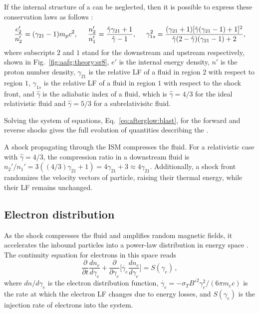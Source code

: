 If the internal structure of a \blast{} can be neglected, then 
it is possible to express these conservation laws as follows 
\citep{Blandford:1976,Rezzolla:2013}: 
\begin{equation}
\frac{e_2'}{n_2'} = (\gamma_{21} - 1)m_p c^2, \hspace{5mm}
\frac{n_2'}{n_1'} = \frac{\hat{\gamma}\gamma_{21} + 1}{\hat{\gamma}-1}, \hspace{5mm}
\gamma_{1s}^2 = \frac{(\gamma_{21} + 1) [\hat{\gamma}(\gamma_{21}-1)+1]^2}{\hat{\gamma}(2-\hat{\gamma})(\gamma_{21}-1)+2},
\label{eq:afterglow:blast}
\end{equation}
where subscripts $2$ and $1$ stand for the downstream and upstream respectively, 
shown in Fig.~\ref{fig:aafg:theory:sr8}, 
$e'$ is the internal energy density, $n'$ is the proton number density, 
$\gamma_{21}$ is the relative \ac{LF} of a fluid in region $2$ with respect to region $1$, 
$\gamma_{1s}$ is the relative \ac{LF} of a fluid in region $1$ with respect to the shock front, and
$\hat{\gamma}$ is the adiabatic index of a fluid, which is $\hat{\gamma}=4/3$ 
for the ideal relativistic fluid and $\hat{\gamma}=5/3$ for a subrelativisitc fluid.

Solving the system of equations, Eq.~\eqref{eq:afterglow:blast}, for the 
forward and reverse shocks gives the full evolution of 
quantities describing the \blast{}. 

A shock propagating through the \ac{ISM} compresses the fluid. 
For a relativistic case with $\hat{\gamma}=4/3$, the compression ratio in a downstream fluid is 
$n_2'/n_1' = 3 ((4/3)\gamma_{21} + 1) = 4\gamma_{21} + 3 \approx 4 \gamma_{21}$. 
%
Additionally, a shock front randomizes the velocity vectors 
of particle, raising their thermal energy, while their \ac{LF} remains
unchanged.


\subsection{Electron distribution}

As the shock compresses the fluid and amplifies random magnetic fields, it accelerates the 
inbound particles into a power-law distribution in energy space 
\citep[\eg][]{Kumar:2014upa}. 
%
The continuity equation for electrons in this space reads 
\begin{equation}
\label{eq:intro:electron_dist_cont_eq}
\frac{\partial }{\partial t}\frac{d n_e}{d\gamma_e} + \frac{\partial}{\partial \gamma_e}\Big[ \dot{\gamma_e}\frac{dn_e}{d\gamma_e} \Big] = S(\gamma_e)\, ,
\end{equation}
%
where $dn/d\gamma_e$ is the electron distribution function, 
$\dot{\gamma_e} = -\sigma_T B'^2 \gamma_e^2 / (6\pi m_e c)$ is the rate at 
which the electron \ac{LF} changes due to energy losses, 
and $S(\gamma_e)$ is the injection 
rate of electrons into the system.

